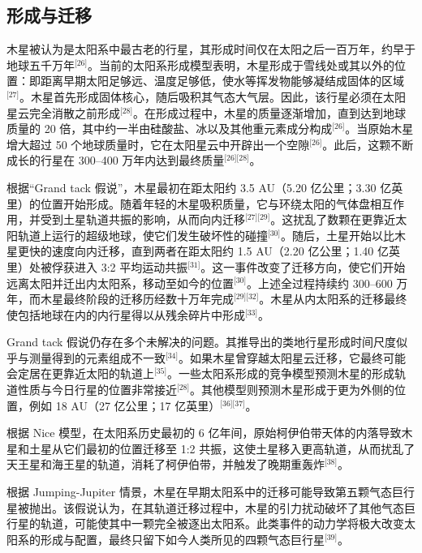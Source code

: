 \subsection{形成与迁移}
木星被认为是太阳系中最古老的行星，其形成时间仅在太阳之后一百万年，约早于地球五千万年\(^\text{[26]}\)。当前的太阳系形成模型表明，木星形成于雪线处或其以外的位置：即距离早期太阳足够远、温度足够低，使水等挥发物能够凝结成固体的区域\(^\text{[27]}\)。木星首先形成固体核心，随后吸积其气态大气层。因此，该行星必须在太阳星云完全消散之前形成\(^\text{[28]}\)。在形成过程中，木星的质量逐渐增加，直到达到地球质量的 20 倍，其中约一半由硅酸盐、冰以及其他重元素成分构成\(^\text{[26]}\)。当原始木星增大超过 50 个地球质量时，它在太阳星云中开辟出一个空隙\(^\text{[26]}\)。此后，这颗不断成长的行星在 300–400 万年内达到最终质量\(^\text{[26][28]}\)。

根据“Grand tack 假说”，木星最初在距太阳约 3.5 AU（5.20 亿公里；3.30 亿英里）的位置开始形成。随着年轻的木星吸积质量，它与环绕太阳的气体盘相互作用，并受到土星轨道共振的影响，从而向内迁移\(^\text{[27][29]}\)。这扰乱了数颗在更靠近太阳轨道上运行的超级地球，使它们发生破坏性的碰撞\(^\text{[30]}\)。随后，土星开始以比木星更快的速度向内迁移，直到两者在距太阳约 1.5 AU（2.20 亿公里；1.40 亿英里）处被俘获进入 3:2 平均运动共振\(^\text{[31]}\)。这一事件改变了迁移方向，使它们开始远离太阳并迁出内太阳系，移动至如今的位置\(^\text{[30]}\)。上述全过程持续约 300–600 万年，而木星最终阶段的迁移历经数十万年完成\(^\text{[29][32]}\)。木星从内太阳系的迁移最终使包括地球在内的内行星得以从残余碎片中形成\(^\text{[33]}\)。

Grand tack 假说仍存在多个未解决的问题。其推导出的类地行星形成时间尺度似乎与测量得到的元素组成不一致\(^\text{[34]}\)。如果木星曾穿越太阳星云迁移，它最终可能会定居在更靠近太阳的轨道上\(^\text{[35]}\)。一些太阳系形成的竞争模型预测木星的形成轨道性质与今日行星的位置非常接近\(^\text{[28]}\)。其他模型则预测木星形成于更为外侧的位置，例如 18 AU（27 亿公里；17 亿英里）\(^\text{[36][37]}\)。

根据 Nice 模型，在太阳系历史最初的 6 亿年间，原始柯伊伯带天体的内落导致木星和土星从它们最初的位置迁移至 1:2 共振，这使土星移入更高轨道，从而扰乱了天王星和海王星的轨道，消耗了柯伊伯带，并触发了晚期重轰炸\(^\text{[38]}\)。

根据 Jumping-Jupiter 情景，木星在早期太阳系中的迁移可能导致第五颗气态巨行星被抛出。该假说认为，在其轨道迁移过程中，木星的引力扰动破坏了其他气态巨行星的轨道，可能使其中一颗完全被逐出太阳系。此类事件的动力学将极大改变太阳系的形成与配置，最终只留下如今人类所见的四颗气态巨行星\(^\text{[39]}\)。

